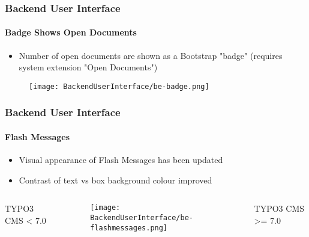 \begin{frame}[fragile]
	\frametitle{Backend User Interface}
	\framesubtitle{Badge Shows Open Documents}

	\begin{itemize}
		\item Number of open documents are shown as a Bootstrap "badge"\newline
			(requires system extension "Open Documents")
	\end{itemize}
	\begin{figure}
		\texttt{[image: BackendUserInterface/be-badge.png]}
	\end{figure}

\end{frame}


\begin{frame}[fragile]
	\frametitle{Backend User Interface}
	\framesubtitle{Flash Messages}

	\begin{itemize}
		\item Visual appearance of Flash Messages has been updated 
		\item Contrast of text vs box background colour improved
	\end{itemize}

	\begin{columns}[T]
		\begin{column}{.25\textwidth}
			\smaller\hfill 
				\begingroup\color{typo3red}TYPO3 CMS < 7.0\endgroup
			\normalsize
		\end{column}

		\begin{column}{.5\textwidth}
			\begin{figure}\vspace*{-0.6cm}
				\texttt{[image: BackendUserInterface/be-flashmessages.png]}
			\end{figure}
		\end{column}

		\begin{column}{.25\textwidth}
			\smaller
				\begingroup\color{typo3red}TYPO3 CMS >= 7.0\endgroup
			\normalsize
		\end{column}

	\end{columns}

\end{frame}

